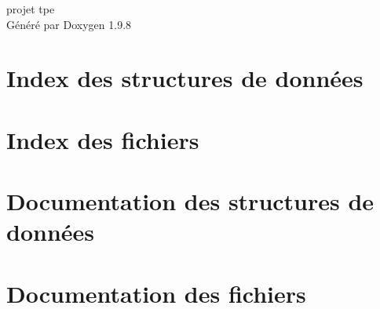 \documentclass[twoside]{book}
\newcommand{\+}{\discretionary{\mbox{\scriptsize$\hookleftarrow$}}{}{}}
\newcommand{\clearemptydoublepage}{%
    \newpage{\pagestyle{empty}\cleardoublepage}%
  }
\begin{document}
  \raggedbottom
    \hypersetup{pageanchor=false,
                bookmarksnumbered=true,
                pdfencoding=unicode
               }
  \begin{titlepage}
  \vspace*{7cm}
  \begin{center}%
  {\Large projet tpe}\\
  \vspace*{1cm}
  {\large Généré par Doxygen 1.9.8}\\
  \end{center}
  \end{titlepage}
  \clearemptydoublepage
  \tableofcontents
  \clearemptydoublepage
  \hypersetup{pageanchor=true}
\chapter{Index des structures de données}

\chapter{Index des fichiers}

\chapter{Documentation des structures de données}




\chapter{Documentation des fichiers}



























  \backmatter
  \newpage
  \clearemptydoublepage
  \printindex
\end{document}
